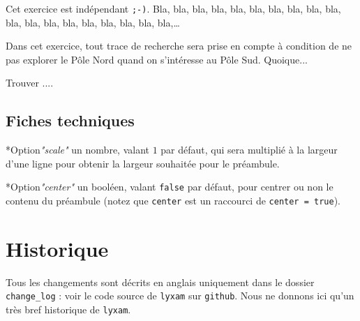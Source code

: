 \documentclass[12pt,a4paper]{scrartcl}
\makeatletter
\theoremstyle{definition}
\newcommand\resetallcnt{
    	\setcounter{lyxam@counter@topic}{0}
    	\setcounter{lyxam@counter@exercise}{0}
    	\setcounter{lyxam@counter@problem}{0}
    	\setcounter{lyxam@counter@bonus}{0}
    	\setcounter{lyxam@counter@subpart}{0}
    }
\newcommand\IDenv{\@ifstar{\@IDenvStar}{\@IDenvNoStar}}
\newcommand\@IDenvNoStar[3]{%
    \texttt{%
    	\textbackslash#1%
    	\IfStrEq{#2}{0}{}{%
    		\,\,[#2 Option%
			\IfStrEq{#2}{1}{}{s}]%
		}%
	    \IfStrEq{#3}{}{}{%
    		\,\,(#3 Argument%
			\IfStrEq{#3}{1}{}{s})%
		}
   	}
    \immediate\write\tempfile{env@#1@#2@#3}%
}
\newcommand\@IDenvStar[2]{%
    \@IDenvNoStar{#1}{0}{#2}%
}
\newcommand\@IDoptarg{\@ifstar{\@IDoptargStar}{\@IDoptargNoStar}}
\newcommand\@IDoptargStar[2]{%
	\vspace{0.5em}
	--- \texttt{#1%
		\IfStrEq{#2}{}{:}{\,#2:}%
	}%
}
\newcommand\@IDoptargNoStar[2]{%
	\IfStrEq{#2}{}{%
		\@IDoptargStar{#1}{}%
	}{%
		\@IDoptargStar{#1}{\##2}%
	}%
}
\newcommand\IDkey[1]{%
	\@IDoptarg*{Option}{{\itshape "#1"}}%
}
\makeatother
\begin{document}
\resetallcnt{}

\begin{tcblisting}{}
\begin{preamble}[scale = 0.75, center]
    Cet exercice est indépendant \verb+;-)+. Bla, bla, bla, bla, bla, bla,
    bla, bla, bla, bla, bla, bla, bla, bla, bla, bla, bla, bla, bla,\dots
\end{preamble}

\exercise

\begin{preamble}
    Dans cet exercice, tout trace de recherche sera prise en compte à
    condition de ne pas explorer le Pôle Nord quand on s'intéresse
    au Pôle Sud. Quoique...
\end{preamble}

Trouver ....
\end{tcblisting}


    \subsection{Fiches techniques}

\IDenv{preamble}{2}{}

\IDkey{scale} un nombre, valant $1$ par défaut, qui sera multiplié à la largeur d'une ligne pour obtenir la largeur souhaitée pour le préambule.

\IDkey{center} un booléen, valant \verb+false+ par défaut, pour centrer ou non le contenu du préambule (notez que \verb+center+ est un raccourci de \verb+center = true+).





\section{Historique}

Tous les changements sont décrits en anglais uniquement dans le dossier \verb+change_log+ : voir le code source de \verb+lyxam+ sur \verb+github+. Nous ne donnons ici qu'un très bref historique de \verb+lyxam+.
\end{document}
